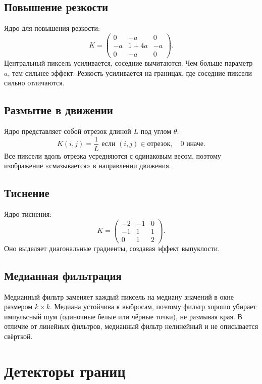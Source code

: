 \documentclass[a4paper,12pt]{article}
\begin{document}
\subsection{Повышение резкости}

Ядро для повышения резкости:
\[
K = \begin{pmatrix} 0 & -a & 0 \\ -a & 1 + 4a & -a \\ 0 & -a & 0 \end{pmatrix}.
\]
Центральный пиксель усиливается, соседние вычитаются. Чем больше параметр $a$, тем сильнее эффект. Резкость усиливается на границах, где соседние пиксели сильно отличаются.

\subsection{Размытие в движении}

Ядро представляет собой отрезок длиной $L$ под углом $\theta$:
\[
K(i, j) = \frac{1}{L} \text{ если } (i, j) \in \text{отрезок}, \quad 0 \text{ иначе}.
\]
Все пиксели вдоль отрезка усредняются с одинаковым весом, поэтому изображение «смазывается» в направлении движения.

\subsection{Тиснение}

Ядро тиснения:
\[
K = \begin{pmatrix} -2 & -1 & 0 \\ -1 & 1 & 1 \\ 0 & 1 & 2 \end{pmatrix}.
\]
Оно выделяет диагональные градиенты, создавая эффект выпуклости.

\subsection{Медианная фильтрация}

Медианный фильтр заменяет каждый пиксель на медиану значений в окне размером $k \times k$. Медиана устойчива к выбросам, поэтому фильтр хорошо убирает импульсный шум (одиночные белые или чёрные точки), не размывая края. В отличие от линейных фильтров, медианный фильтр нелинейный и не описывается свёрткой.

\section{Детекторы границ}
\end{document}
